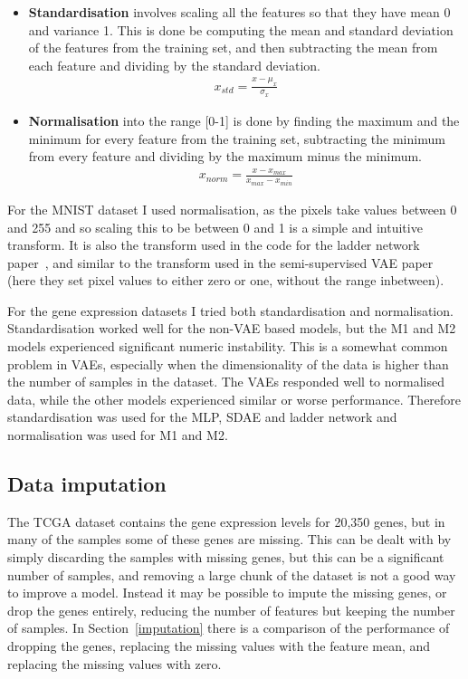 \begin{itemize}
  \item \textbf{Standardisation} involves scaling all the features so that they have mean 0 and variance 1. This is done be computing the mean 
          and standard deviation of the features from the training set, and then subtracting the mean from each feature and dividing by the
          standard deviation.
          \begin{align}
            x_{std} = \frac{x - \mu_{x}}{\sigma_{x}}
          \end{align}
  \item \textbf{Normalisation} into the range [0-1] is done by finding the maximum and the minimum for every feature from the training set,
          subtracting the minimum from every feature and dividing by the maximum minus the minimum.
          \begin{align}
            x_{norm} = \frac{x - x_{max}}{x_{max} - x_{min}}
          \end{align}
\end{itemize}

For the MNIST dataset I used normalisation, as the pixels take values between 0 and 255 and so scaling this to be between 0 and 1 is 
a simple and intuitive transform. It is also the transform used in the code for the ladder network paper~\cite{DBLP:journals/corr/RasmusVHBR15}, 
and similar to the transform used in the semi-supervised VAE paper~\cite{DBLP:journals/corr/KingmaRMW14} (here they set pixel values to 
either zero or one, without the range inbetween).

For the gene expression datasets I tried both standardisation and normalisation. Standardisation worked well for the non-VAE based models,
but the M1 and M2 models experienced significant numeric instability. This is a somewhat common problem in
VAEs, especially when the dimensionality of the data is higher than the number of samples in the dataset. The VAEs responded well to normalised
data, while the other models experienced similar or worse performance. Therefore standardisation was used for the MLP, SDAE and ladder 
network and normalisation was used for M1 and M2.

\subsection{Data imputation} \label{imput}
The TCGA dataset contains the gene expression levels for 20,350 genes, but in many of the samples some of these genes are missing.
This can be dealt with by simply discarding the samples with missing genes, but this can be a significant number of samples, and removing 
a large chunk of the dataset is not a good way to improve a model. Instead it may be possible to impute the missing genes, or drop the 
genes entirely, reducing the number of features but keeping the number of samples. In Section~\ref{imputation} there is a comparison 
of the performance of dropping the genes, replacing the missing values with the feature mean, and replacing the missing values with zero.

